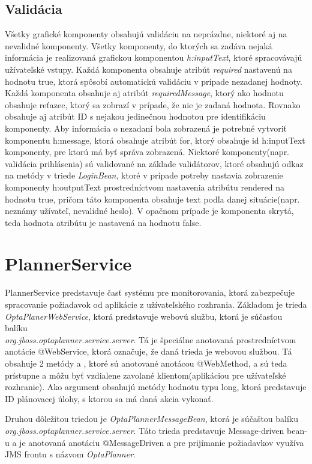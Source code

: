 \subsection{Validácia}
Všetky grafické komponenty obsahujú validáciu na neprázdne, niektoré aj na nevalidné komponenty. Všetky komponenty, do ktorých sa zadáva nejaká informácia je realizovaná grafickou komponentou \emph{h:inputText}, ktoré spracovávajú užívateľské vstupy. Každá komponenta obsahuje atribút \emph{required} nastavenú na hodnotu true, ktorá spôsobí automatickú validáciu v prípade nezadanej hodnoty. Každá komponenta obsahuje aj atribút \emph{requiredMessage}, ktorý ako hodnotu obsahuje reťazec, ktorý sa zobrazí v prípade, že nie je zadaná hodnota. Rovnako obsahuje aj atribút ID s nejakou jedinečnou hodnotou pre identifikáciu komponenty. Aby informácia o nezadaní bola zobrazená je potrebné vytvoriť komponentu h:message, ktorá obsahuje atribút for, ktorý obsahuje id h:inputText komponenty, pre ktorú má byť správa zobrazená. Niektoré komponenty(napr. validácia prihlásenia) sú validované na základe validátorov, ktoré obsahujú odkaz na metódy v triede \emph{LoginBean}, ktoré v prípade potreby nastavia zobrazenie komponenty h:outputText prostredníctvom nastavenia atribútu rendered na hodnotu true, pričom táto komponenta obsahuje text podľa danej situácie(napr. neznámy užívateľ, nevalidné heslo). V opačnom prípade je komponenta skrytá, teda hodnota atribútu je nastavená na hodnotu false.




\section{PlannerService}\label{plannerapp}
PlannerService predstavuje časť systému pre monitorovania, ktorá zabezpečuje spracovanie požiadavok od aplikácie z užívateľského rozhrania. Základom je trieda \emph{OptaPlanerWebService}, ktorá predstavuje  webovú službu, ktorá je súčasťou balíku \\\emph{org.jboss.optaplanner.service.server}. Tá je špeciálne anotovaná prostredníctvom anotácie @WebService, ktorá označuje, že daná trieda je webovou službou. Tá obsahuje 2 metódy  a , ktoré sú anotované anotácou @WebMethod, a sú teda prístupne a môžu byť vzdialene zavolané klientom(aplikáciou pre užívateľské rozhranie). Ako argument obsahujú metódy hodnotu typu long, ktorá predstavuje ID plánovacej úlohy, s ktorou sa má daná akcia vykonať.

Druhou dôležitou triedou je \emph{OptaPlannerMessageBean}, ktorá je súčaštou balíku \\\emph{org.jboss.optaplanner.service.server}. Táto trieda predstavuje Message-driven bean-u a je anotovaná anotáciu @MessageDriven a pre prijímanie požiadavkov využíva JMS frontu s názvom \emph{OptaPlanner}.

